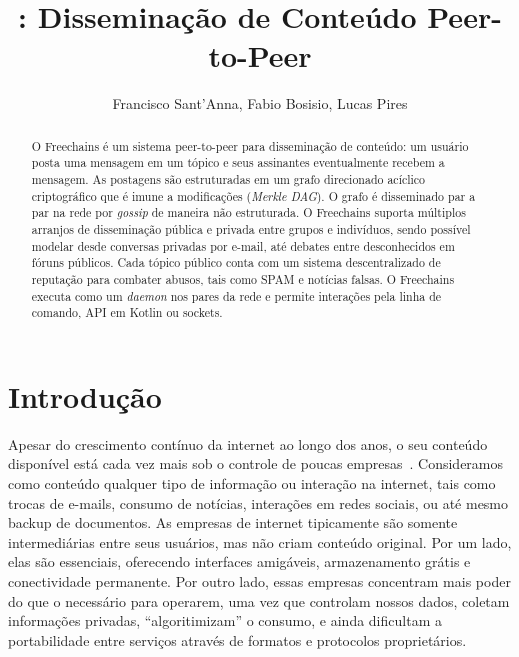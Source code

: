 \documentclass[12pt]{article}
\title{\FC: Disseminação de Conteúdo Peer-to-Peer}
\author {
    Francisco Sant'Anna,
    Fabio Bosisio,
    Lucas Pires
}
\newcommand{\FC} {Freechains\xspace}
\begin{document}
 

\maketitle

\begin{abstract}
O \FC é um sistema peer-to-peer para disseminação de conteúdo: um
usuário posta uma mensagem em um tópico e seus assinantes eventualmente recebem
a mensagem.
As postagens são estruturadas em um grafo direcionado acíclico criptográfico
que é imune a modificações (\emph{Merkle DAG}).
O grafo é disseminado par a par na rede por \emph{gossip} de maneira não
estruturada.
O \FC suporta múltiplos arranjos de disseminação pública e privada entre grupos
e indivíduos, sendo possível modelar desde conversas privadas por e-mail, até
debates entre desconhecidos em fóruns públicos.
Cada tópico público conta com um sistema descentralizado de reputação para
combater abusos, tais como SPAM e notícias falsas.
O \FC executa como um \emph{daemon} nos pares da rede e permite
interações pela linha de comando, API em Kotlin ou sockets.
\end{abstract}
     

\section{Introdução}

Apesar do crescimento contínuo da internet ao longo dos anos, o seu conteúdo
disponível está cada vez mais sob o controle de poucas
empresas~\cite{internet.fixing}.
Consideramos como conteúdo qualquer tipo de informação ou interação na
internet, tais como trocas de e-mails, consumo de notícias, interações em redes
sociais, ou até mesmo backup de documentos.
%
As empresas de internet tipicamente são somente intermediárias entre seus
usuários, mas não criam conteúdo original.
Por um lado, elas são essenciais, oferecendo interfaces amigáveis,
armazenamento grátis e conectividade permanente.
Por outro lado, essas empresas concentram mais poder do que o necessário para
operarem, uma vez que controlam nossos dados, coletam informações privadas,
``algoritimizam'' o consumo, e ainda dificultam a portabilidade entre serviços
através de formatos e protocolos proprietários.
\end{document}
